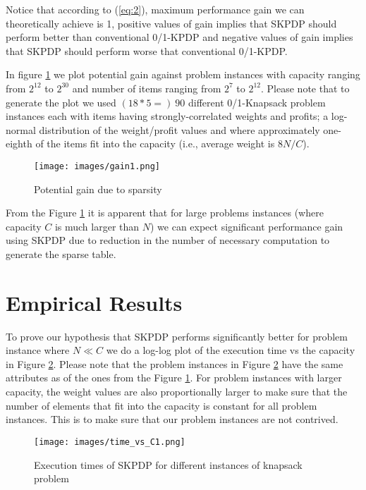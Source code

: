 Notice that according to (\ref{eq:2}), maximum performance gain we can
theoretically achieve is 1, positive values of gain implies that SKPDP should
perform better than conventional 0/1-KPDP and negative values of gain implies
that SKPDP should perform worse that conventional 0/1-KPDP.

In figure \ref{fig:gain1} we plot potential gain against problem instances
with capacity ranging from $2^{12}$ to $2^{30}$ and number of items ranging
from $2^7$ to $2^{12}$.  Please note that to generate the plot we used
$(18*5=)\ 90$ different 0/1-Knapsack problem instances each with items having
strongly-correlated weights and profits; a log-normal distribution of the
weight/profit values and where approximately one-eighth of the items fit into
the capacity (i.e., average weight is $8N/C$).

\begin{figure}[htbp]
\centerline{\texttt{[image: images/gain1.png]}}
\caption{Potential gain due to sparsity}
\label{fig:gain1}
\end{figure}

From the Figure \ref{fig:gain1} it is apparent that for large problems
instances (where capacity $C$ is much larger than $N$) we can expect
significant performance gain using SKPDP due to reduction in the number of
necessary computation to generate the sparse table.

\section{Empirical Results}
To prove our hypothesis that SKPDP performs significantly better for problem
instance where $N \ll C$ we do a log-log plot of the execution time vs the
capacity in Figure \ref{fig:time_vs_c1}.  Please note that the problem
instances in Figure \ref{fig:time_vs_c1} have the same attributes as of the
ones from the Figure \ref{fig:gain1}.  For problem instances with larger
capacity, the weight values are also proportionally larger to make sure that
the number of elements that fit into the capacity is constant for all problem
instances.  This is to make sure that our problem instances are not contrived.
 
\begin{figure}[htbp]
\centerline{\texttt{[image: images/time\_vs\_C1.png]}}
\caption{Execution times of SKPDP for different instances of knapsack problem}
\label{fig:time_vs_c1}
\end{figure}


